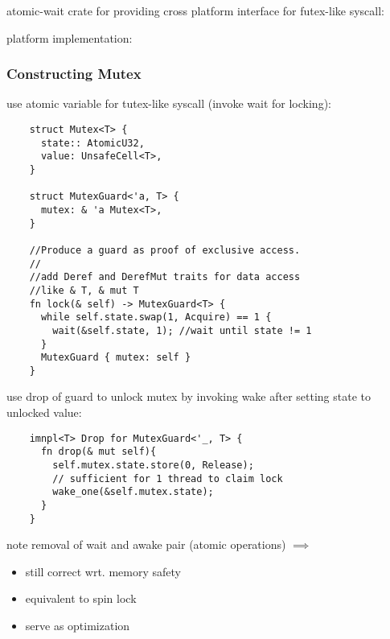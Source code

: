 \documentclass[8pt]{extarticle}
\begin{document}
\begin{multicols*}{2}
    atomic-wait crate for providing cross platform interface for futex-like syscall:
    \begin{itemize}
    \item \verb%wait(& AtomicU32, u32)%
    \item \verb%wake_one(& AtomicU32)%
    \item \verb%wake_all(& AtomicU32)%
    \end{itemize}
    platform implementation:

    \subsubsection{Constructing Mutex}
    use atomic variable for tutex-like syscall (invoke wait for locking):
\begin{verbatim}
    struct Mutex<T> {
      state:: AtomicU32,
      value: UnsafeCell<T>,
    }

    struct MutexGuard<'a, T> {
      mutex: & 'a Mutex<T>,
    }

    //Produce a guard as proof of exclusive access.
    //
    //add Deref and DerefMut traits for data access
    //like & T, & mut T
    fn lock(& self) -> MutexGuard<T> {
      while self.state.swap(1, Acquire) == 1 {
        wait(&self.state, 1); //wait until state != 1
      }
      MutexGuard { mutex: self }
    }
\end{verbatim}

    use drop of guard to unlock mutex by invoking wake after setting state to unlocked value:
\begin{verbatim}
    imnpl<T> Drop for MutexGuard<'_, T> {
      fn drop(& mut self){
        self.mutex.state.store(0, Release);
        // sufficient for 1 thread to claim lock
        wake_one(&self.mutex.state);
      }
    }
\end{verbatim}    

    note removal of wait and awake pair (atomic operations) $\implies$
    \begin{itemize}
    \item still correct wrt. memory safety
    \item equivalent to spin lock
    \item serve as optimization
    \end{itemize}


\end{multicols*}
\end{document}
